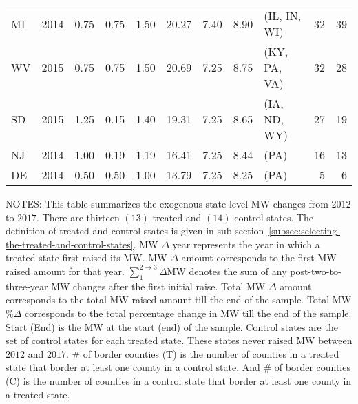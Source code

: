 \begin{table}[H]
{\begin{tabular}{lrrrrrrrlrr}
            MI             & 2014             & 0.75               & 0.75                    & 1.50                     & 20.27               & 7.40     & 8.90   & (IL, IN, WI)   & 32               & 39               \\
            WV             & 2015             & 0.75               & 0.75                    & 1.50                     & 20.69               & 7.25     & 8.75   & (KY, PA, VA)   & 32               & 28               \\
            SD             & 2015             & 1.25               & 0.15                    & 1.40                     & 19.31               & 7.25     & 8.65   & (IA, ND, WY)   & 27               & 19               \\
            NJ             & 2014             & 1.00               & 0.19                    & 1.19                     & 16.41               & 7.25     & 8.44   & (PA)           & 16               & 13               \\
            DE             & 2014             & 0.50               & 0.50                    & 1.00                     & 13.79               & 7.25     & 8.25   & (PA)           & 5                & 6                \\\bottomrule\bottomrule
        \end{tabular}
    }
    \begin{minipage}{14cm}
        \vspace{0.01in}
        \tiny NOTES: This table summarizes the exogenous state-level MW changes from $2012$ to $2017$. There are thirteen $(13)$ treated and $(14)$ control states. The definition of treated and control states is given in sub-section~\ref{subsec:selecting-the-treated-and-control-states}. MW $\Delta$ year represents the year in which a treated state first raised its MW. MW $\Delta$ amount corresponds to the first MW raised amount for that year. $\sum_{1}^{2 \rightarrow 3}\Delta$MW denotes the sum of any post-two-to-three-year MW changes after the first initial raise. Total MW $\Delta$ amount corresponds to the total MW raised amount till the end of the sample. Total MW $\%\Delta$ corresponds to the total percentage change in MW till the end of the sample. Start (End) is the MW at the start (end) of the sample. Control states are the set of control states for each treated state. These states never raised MW between $2012$ and $2017$. \# of border counties (T) is the number of counties in a treated state that border at least one county in a control state. And \# of border counties (C) is the number of counties in a control state that border at least one county in a treated state.
    \end{minipage}
\end{table}